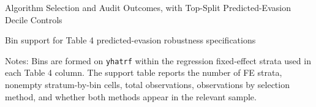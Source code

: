 \documentclass{article}
\newcommand{\OutPath}{Output/}%
\newcommand{\OutPath}{../Output/}%
\begin{document}
\begin{landscape}
\begin{table}[H]\centering
\begin{adjustbox}{max width=1.4\textwidth}
\begin{threeparttable}
\caption{Algorithm Selection and Audit Outcomes, with Top-Split Predicted-Evasion Decile Controls}
\label{tab:table4_main_outcomes_yhatrf_topsplit_control}

\footnotesize


\begin{tablenotes}[flushleft]
\end{tablenotes}
\end{threeparttable}
\end{adjustbox}
\end{table}

\begin{table}[H]\centering
\begin{adjustbox}{max width=1.4\textwidth, max totalheight=0.82\textheight}
\begin{threeparttable}
\caption{Bin support for Table 4 predicted-evasion robustness specifications}
\label{tab:table4_main_outcomes_yhatrf_bin_support}

\scriptsize


\begin{tablenotes}[flushleft]
\scriptsize
\item Notes: Bins are formed on \texttt{yhatrf} within the regression fixed-effect strata used in each Table 4 column. The support table reports the number of FE strata, nonempty stratum-by-bin cells, total observations, observations by selection method, and whether both methods appear in the relevant sample.
\end{tablenotes}
\end{threeparttable}
\end{adjustbox}
\end{table}

\end{landscape}
\end{document}
